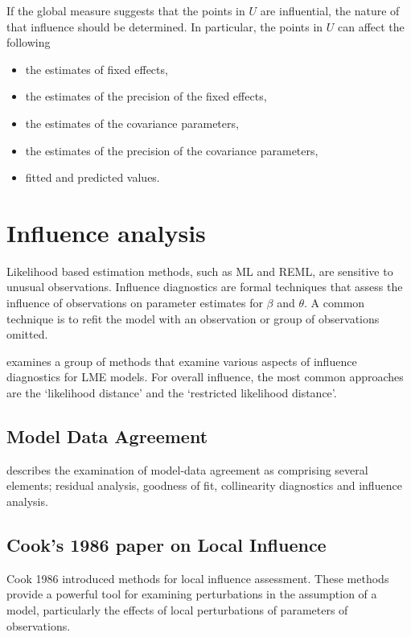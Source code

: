 \documentclass[12pt, a4paper]{article}
\begin{document}
If the global measure suggests that the points in $U$ are influential, the nature of that influence should be determined. In particular, the points in $U$ can affect the following

\begin{itemize}
	\item the estimates of fixed effects,
	\item the estimates of the precision of the fixed effects,
	\item the estimates of the covariance parameters,
	\item the estimates of the precision of the covariance parameters,
	\item fitted and predicted values.
\end{itemize}




\section{Influence analysis} %

Likelihood based estimation methods, such as ML and REML, are sensitive to unusual observations. Influence diagnostics are formal techniques that assess the influence of observations on parameter estimates for $\beta$ and $\theta$. A common technique is to refit the model with an observation or group of observations omitted.

\citet{west} examines a group of methods that examine various aspects of influence diagnostics for LME models.
For overall influence, the most common approaches are the `likelihood distance' and the `restricted likelihood distance'.

\subsection{Model Data Agreement} %
\citet{schabenberger} describes the examination of model-data agreement as comprising several elements; residual analysis, goodness of fit, collinearity diagnostics and influence analysis.
	


\subsection{Cook's 1986 paper on Local Influence}%
Cook 1986 introduced methods for local influence assessment. These methods provide a powerful tool for examining perturbations in the assumption of a model, particularly the effects of local perturbations of parameters of observations.
\end{document}
